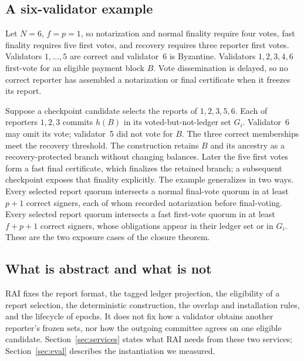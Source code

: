\subsection{A six-validator example}
Let $N=6$, $f=p=1$, so notarization and normal finality require four votes, fast finality requires five first votes, and recovery requires three reporter first votes. Validators $1,\ldots,5$ are correct and validator~6 is Byzantine. Validators $1,2,3,4,6$ first-vote for an eligible payment block $B$. Vote dissemination is delayed, so no correct reporter has assembled a notarization or final certificate when it freezes its report.

Suppose a checkpoint candidate selects the reports of $1,2,3,5,6$. Each of reporters $1,2,3$ commits $h(B)$ in its voted-but-not-ledger set $G_i$. Validator~6 may omit its vote; validator~5 did not vote for $B$. The three correct memberships meet the recovery threshold. The construction retains $B$ and its ancestry as a recovery-protected branch without changing balances. Later the five first votes form a fast final certificate, which finalizes the retained branch; a subsequent checkpoint exposes that finality explicitly. The example generalizes in two ways. Every selected report quorum intersects a normal final-vote quorum in at least $p+1$ correct signers, each of whom recorded notarization before final-voting. Every selected report quorum intersects a fast first-vote quorum in at least $f+p+1$ correct signers, whose obligations appear in their ledger set or in $G_i$. These are the two exposure cases of the closure theorem.

\subsection{What is abstract and what is not}
RAI fixes the report format, the tagged ledger projection, the eligibility of a report selection, the deterministic construction, the overlap and installation rules, and the lifecycle of epochs. It does not fix how a validator obtains another reporter's frozen sets, nor how the outgoing committee agrees on one eligible candidate. Section~\ref{sec:services} states what RAI needs from these two services; Section~\ref{sec:eval} describes the instantiation we measured.

